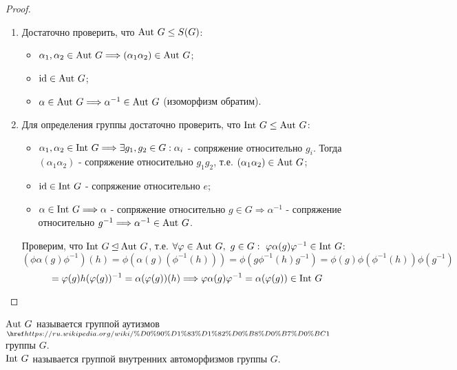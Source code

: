 \begin{proof}\tab
    \begin{enumerate}
        \item Достаточно проверить, что $\textup{Aut } G  \leq S(G)$:
        \begin{itemize}
            \item $\alpha_1, \alpha_2 \in \textup{Aut } G \Longrightarrow (\alpha_1\alpha_2) \in \textup{Aut } G$;
            \item $\textup{id} \in \textup{Aut } G$;
            \item $\alpha \in \textup{Aut } G \Longrightarrow \alpha^{-1} \in \textup{Aut } G$ (изоморфизм обратим).
        \end{itemize} 
        \item Для определения группы достаточно проверить, что $\textup{Int } G \leq \textup{Aut } G$:
        \begin{itemize}
            \item $\alpha_1, \alpha_2 \in \textup{Int } G \Longrightarrow \exists g_1, g_2 \in G: \alpha_i$ - сопряжение относительно $g_i$. Тогда $(\alpha_1\alpha_2)$ - сопряжение относительно $g_1g_2$, т.е. $(\alpha_1\alpha_2) \in \textup{Aut } G$;
            \item $\textup{id} \in \textup{Int } G$ - сопряжение относительно $e$;
            \item $\alpha \in \textup{Int } G \Longrightarrow \alpha$ - сопряжение относительно $g \in G \Longrightarrow \alpha^{-1}$ - сопряжение относительно $g^{-1} \Longrightarrow \alpha^{-1} \in \textup{Aut } G$.
        \end{itemize}  
        Проверим, что $\textup{Int }G \unlhd \textup{Aut }G$, т.е. $\forall \phi \in \textup{Aut }G,\ g \in G : \ \phi\alpha(g)\phi^{-1} \in \textup{Int } G$:
        \[(\phi\alpha(g)\phi^{-1})(h) = \phi(\alpha(g)(\phi^{-1}(h))) = \phi(g\phi^{-1}(h)g^{-1}) = \phi(g)\phi(\phi^{-1}(h))\phi(g^{-1})\]
        \[= \phi(g)h(\phi(g))^{-1} = \alpha(\phi(g))(h) \Longrightarrow \phi\alpha(g)\phi^{-1} = \alpha(\phi(g)) \in \textup{Int } G\]
    \end{enumerate}
\end{proof}
\begin{definition}
    $\textup{Aut }G$ называется группой аутизмов$_{\href{https://ru.wikipedia.org/wiki/\%D0\%90\%D1\%83\%D1\%82\%D0\%B8\%D0\%B7\%D0\%BC}{1}}$ группы $G$.\\
    $\textup{Int }G$ называется группой внутренних автоморфизмов группы $G$.
\end{definition}
